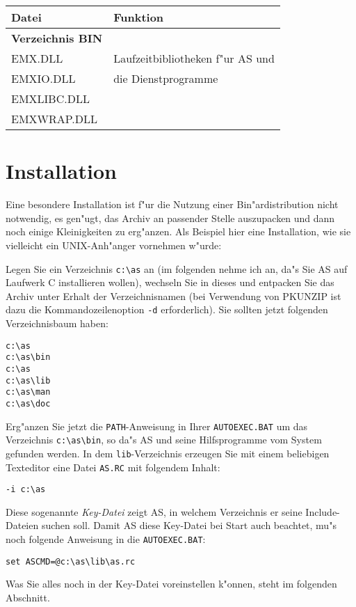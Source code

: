 \documentclass[12pt,a4paper,twoside]{report}
\newcommand{\tty}[1]{{\tt #1}}
\begin{document}
\begin{table*}[htp]
\begin{center}\begin{tabular}{|l|l|}
\hline
Datei             & Funktion \\
\hline
\hline
{\bf Verzeichnis BIN} & \\
\hline
EMX.DLL           & Laufzeitbibliotheken f"ur AS und \\
EMXIO.DLL         & die Dienstprogramme \\
EMXLIBC.DLL       & \\
EMXWRAP.DLL       & \\
\hline
\end{tabular}\end{center}
\caption{Zus"atzliche Dateien in einer OS/2-Bin"ardistribution
         \label{TabOS2PackageList}}
\end{table*}


\section{Installation}

Eine besondere  Installation ist f"ur die Nutzung
einer Bin"ardistribution nicht notwendig, es gen"ugt, das Archiv an
passender Stelle auszupacken und dann noch einige Kleinigkeiten zu
erg"anzen.  Als Beispiel hier eine Installation, wie sie vielleicht
ein UNIX-Anh"anger vornehmen w"urde:

Legen Sie ein Verzeichnis \verb!c:\as! an (im folgenden nehme ich an,
da"s Sie AS auf Laufwerk C installieren wollen), wechseln Sie in dieses
und entpacken Sie das Archiv unter Erhalt der Verzeichnisnamen (bei
Verwendung von PKUNZIP ist dazu die Kommandozeilenoption \verb!-d!
erforderlich).  Sie sollten jetzt folgenden Verzeichnisbaum haben:
\begin{verbatim}
c:\as
c:\as\bin
c:\as
c:\as\lib
c:\as\man
c:\as\doc
\end{verbatim}
Erg"anzen Sie jetzt die \tty{PATH}-Anweisung in Ihrer \tty{AUTOEXEC.BAT}
um das Verzeichnis \verb!c:\as\bin!, so da"s AS und seine Hilfsprogramme
vom System gefunden werden.  In dem \tty{lib}-Verzeichnis erzeugen Sie
mit einem beliebigen Texteditor eine Datei \tty{AS.RC} mit folgendem
Inhalt:
\begin{verbatim}
-i c:\as
\end{verbatim}
Diese sogenannte {\em Key-Datei} zeigt AS, in welchem Verzeichnis er seine
Include-Dateien suchen soll.  Damit AS diese Key-Datei bei Start
auch beachtet, mu"s noch folgende Anweisung in die \tty{AUTOEXEC.BAT}:
\begin{verbatim}
set ASCMD=@c:\as\lib\as.rc
\end{verbatim}
Was Sie alles noch in der Key-Datei voreinstellen k"onnen, steht im
folgenden Abschnitt.
\end{document}
